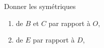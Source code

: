
\begin{exercice}\label{exosmath-0988}

    Donner les symétriques
    \begin{enumerate}
        \item
            de \( B \) et \( C\) par rapport à \( O\),
        \item
            de \( E\) par rapport à \( D\),
    \end{enumerate}

\begin{center}
   
\end{center}

\end{exercice}
